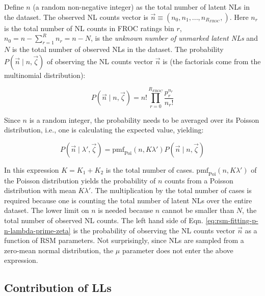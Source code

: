 \documentclass[
]{book}
\begin{document}
Define \(n\) (a random non-negative integer) as the total number of latent NLs in the dataset. The observed NL counts vector is \(\overrightarrow{n} \equiv \left ( n_0, n_1, ...,n_{R_{FROC}}, \right )\). Here \(n_r\) is the total number of NL counts in FROC ratings bin \(r\), \(n_0 = n - \sum_{r=1}^{R} n_r = n - N\), is the \emph{unknown number of unmarked latent NLs} and \(N\) is the total number of observed NLs in the dataset. The probability \(P\left ( \overrightarrow{n} \mid n, \overrightarrow{\zeta} \right )\) of observing the NL counts vector \(\overrightarrow{n}\) is (the factorials come from the multinomial distribution):

\begin{equation}
P\left ( \overrightarrow{n} \mid n, \overrightarrow{\zeta} \right ) = n! \prod_{r=0}^{R_{FROC}} \frac{p_r^{n_r}}{n_r!}
\label{eq:rsm-fitting-pnvector}
\end{equation}

Since \(n\) is a random integer, the probability needs to be averaged over its Poisson distribution, i.e., one is calculating the expected value, yielding:

\begin{equation}
P\left ( \overrightarrow{n} \mid \lambda', \overrightarrow{\zeta} \right ) = \text{pmf}_{\text{Poi}} \left ( n, K\lambda' \right ) P\left ( \overrightarrow{n} \mid n, \overrightarrow{\zeta} \right )
\label{eq:rsm-fitting-p-n-lambda-prime-zeta}
\end{equation}

In this expression \(K = K_1 + K_2\) is the total number of cases. \(\text{pmf}_{\text{Poi}} \left ( n, K\lambda' \right )\) of the Poisson distribution yields the probability of \(n\) counts from a Poisson distribution with mean \(K\lambda'\). The multiplication by the total number of cases is required because one is counting the total number of latent NLs over the entire dataset. The lower limit on \(n\) is needed because \(n\) cannot be smaller than \(N\), the total number of observed NL counts. The left hand side of Eqn. \eqref{eq:rsm-fitting-p-n-lambda-prime-zeta} is the probability of observing the NL counts vector \(\overrightarrow{n}\) as a function of RSM parameters. Not surprisingly, since NLs are sampled from a zero-mean normal distribution, the \(\mu\) parameter does not enter the above expression.

\hypertarget{rsm-fitting-froc-lls}{%
\subsection{Contribution of LLs}\label{rsm-fitting-froc-lls}}
\end{document}
